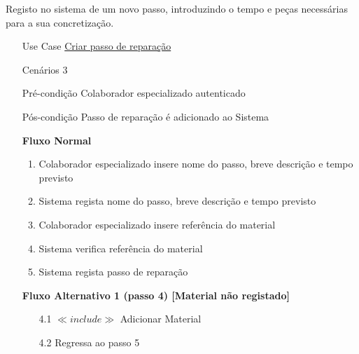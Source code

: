 \documentclass[../relatorio.tex]{subfiles}
\begin{document}
Registo no sistema de um novo passo, introduzindo o tempo e peças necessárias para a sua concretização.
\begin{itemize}
    \item[Use Case] {\underline{Criar passo de reparação}}
    \item[Cenários] {3}
    \item[Pré-condição] {Colaborador especializado autenticado}
    \item[Pós-condição] {Passo de reparação é adicionado ao Sistema}
          \begin{flushleft}
              \textbf{Fluxo Normal}
          \end{flushleft}
          \begin{enumerate}
              \item Colaborador especializado insere nome do passo, breve descrição e tempo previsto
              \item Sistema regista nome do passo, breve descrição e tempo previsto
              \item Colaborador especializado insere referência do material
              \item Sistema verifica referência do material
              \item Sistema regista passo de reparação
          \end{enumerate}
          \begin{flushleft}
		      \textbf{Fluxo Alternativo 1 (passo 4) [Material não registado]}
	      \end{flushleft}
	      \begin{itemize}
		      \item[4.1]  $\ll include \gg$ Adicionar Material
              \item[4.2] Regressa ao passo 5
	      \end{itemize}
\end{itemize}
\end{document}

